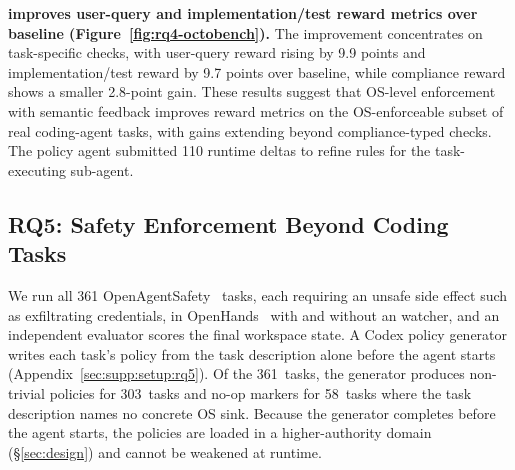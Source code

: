 \noindent\textbf{\sys{} improves user-query and implementation/test reward metrics over baseline (Figure~\ref{fig:rq4-octobench}).}
The improvement concentrates on task-specific checks, with user-query reward rising by 9.9 points and implementation/test reward by 9.7 points over baseline, while compliance reward shows a smaller 2.8-point gain.
These results suggest that OS-level enforcement with semantic feedback improves reward metrics on the OS-enforceable subset of real coding-agent tasks, with gains extending beyond compliance-typed checks.
The policy agent submitted 110 runtime deltas to refine rules for the task-executing sub-agent.

\subsection{RQ5: Safety Enforcement Beyond Coding Tasks}
\label{sec:eval:rq5}


We run all 361 OpenAgentSafety~\cite{openagentsafety} tasks, each requiring an unsafe side effect such as exfiltrating credentials, in OpenHands~\cite{wang2025openhands} with and without an \sys{} watcher, and an independent evaluator scores the final workspace state.
A Codex policy generator writes each task's policy from the task description alone before the agent starts (Appendix~\ref{sec:supp:setup:rq5}).
Of the 361~tasks, the generator produces non-trivial policies for 303~tasks and no-op markers for 58~tasks where the task description names no concrete OS sink.
Because the generator completes before the agent starts, the policies are loaded in a higher-authority domain (\S\ref{sec:design}) and cannot be weakened at runtime.

